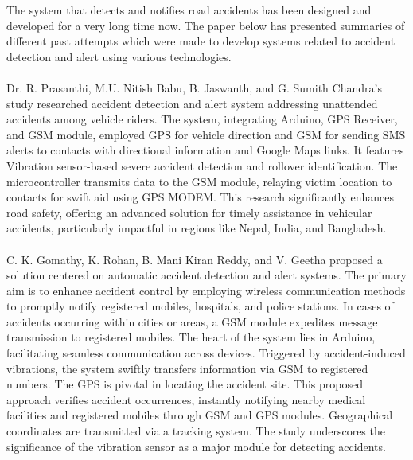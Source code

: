 \documentclass[12pt,a4paper]{report}
\begin{document}
	\begin{justify}
The system that detects and notifies road accidents has been designed and developed for a very long time now. The paper below has presented summaries of different past attempts which were made to develop systems related to accident detection and alert using various technologies.\\\\
Dr. R. Prasanthi, M.U. Nitish Babu, B. Jaswanth, and G. Sumith Chandra's study \cite{Prasanthi2023} researched accident detection and alert system addressing unattended accidents among vehicle riders. The system, integrating Arduino, GPS Receiver, and GSM module, employed GPS for vehicle direction and GSM for sending SMS alerts to contacts with directional information and Google Maps links. It features Vibration sensor-based severe accident detection and rollover identification. The microcontroller transmits data to the GSM module, relaying victim location to contacts for swift aid using GPS MODEM. This research significantly enhances road safety, offering an advanced solution for timely assistance in vehicular accidents, particularly impactful in regions like Nepal, India, and Bangladesh.\\\\
C. K. Gomathy, K. Rohan, B. Mani Kiran Reddy, and V. Geetha \cite{Gomathy2021} proposed a solution centered on automatic accident detection and alert systems. The primary aim is to enhance accident control by employing wireless communication methods to promptly notify registered mobiles, hospitals, and police stations. In cases of accidents occurring within cities or areas, a GSM module expedites message transmission to registered mobiles. The heart of the system lies in Arduino, facilitating seamless communication across devices. Triggered by accident-induced vibrations, the system swiftly transfers information via GSM to registered numbers. The GPS is pivotal in locating the accident site. This proposed approach verifies accident occurrences, instantly notifying nearby medical facilities and registered mobiles through GSM and GPS modules. Geographical coordinates are transmitted via a tracking system. The study underscores the significance of the vibration sensor as a major module for detecting accidents.\\\\

\end{justify}
\end{document}
